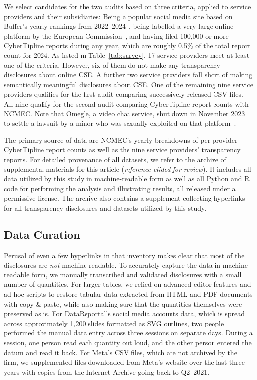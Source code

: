 \documentclass[anonymous,nonacm,screen,12pt]{acmart}
\newcommand\V[1]{{#1}}
\newcommand\V[1]{\textsc{\MakeLowercase{#1}}}
\theoremstyle{definition}
\begin{document}
We select candidates for the two audits based on three criteria, applied to
service providers and their subsidiaries: Being a popular social media site
based on Buffer's yearly rankings from 2022--2024~\cite{Lua2022, Lua2023,
Oladipo2024}, being labelled a very large online platform by the European
Commission~\cite{EuropeanCommission2023b}, and having filed 100,000 or more
CyberTipline reports during any year, which are roughly 0.5\% of the total
report count for 2024. As listed in Table~\ref{tab:survey}, 17 service providers
meet at least one of the criteria. However, six of them do not make any
transparency disclosures about online \V{CSE}. A further two service providers
fall short of making semantically meaningful disclosures about \V{CSE}. One of
the remaining nine service providers qualifies for the first audit comparing
successively released \V{CSV} files. All nine qualify for the second audit
comparing CyberTipline report counts with \V{NCMEC}. Note that Omegle, a video
chat service, shut down in November 2023 to settle a lawsuit by a minor who was
sexually exploited on that platform~\cite{Loffhagen2023}.

The primary source of data are \V{NCMEC}'s yearly breakdowns of per-provider
CyberTipline report counts as well as the nine service providers' transparency
reports. For detailed provenance of all datasets, we refer to the archive of
supplemental materials for this article (\emph{reference elided for review}). It
includes all data utilized by this study in machine-readable form as well as all
Python and R code for performing the analysis and illustrating results, all
released under a permissive license. The archive also contains a supplement
collecting hyperlinks for all transparency disclosures and datasets utilized by
this study.


\subsection{Data Curation}

Perusal of even a few hyperlinks in that inventory makes clear that most of the
disclosures are \emph{not} machine-readable. To accurately capture the data in
machine-readable form, we manually transcribed and validated disclosures with a
small number of quantities. For larger tables, we relied on advanced editor
features and ad-hoc scripts to restore tabular data extracted from \V{HTML} and
\V{PDF} documents with copy \& paste, while also making sure that the quantities
themselves were preserved as is. For DataReportal's social media accounts data,
which is spread across approximately 1,200 slides formatted as \V{SVG} outlines,
two people performed the manual data entry across three sessions on separate
days. During a session, one person read each quantity out loud, and the other
person entered the datum and read it back. For Meta's \V{CSV} files, which are
not archived by the firm, we supplemented files downloaded from Meta's website
over the last three years with copies from the Internet Archive going back to
\V{Q2}~2021.
\end{document}
